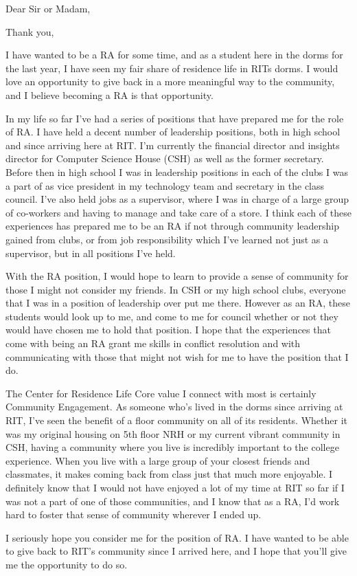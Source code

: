 \documentclass[11pt,a4paper,sans]{moderncv}        %
\begin{document}
\date{\today}
\opening{Dear Sir or Madam,}
\closing{Thank you,}
\makelettertitle


	I have wanted to be a RA for some time, and as a student here in the dorms for the last year, I have seen my fair share of residence life in RITs dorms. I would love an opportunity to give back in a more meaningful way to the community, and I believe becoming a RA is that opportunity.


	In my life so far I've had a series of positions that have prepared me for the role of RA. I have held a decent number of leadership positions, both in high school and since arriving here at RIT. I'm currently the financial director and insights director for Computer Science House (CSH) as well as the former secretary. Before then in high school I was in leadership positions in each of the clubs I was a part of as vice president in my technology team and secretary in the class council. I've also held jobs as a supervisor, where I was in charge of a large group of co-workers and having to manage and take care of a store. I think each of these experiences has prepared me to be an RA if not through community leadership gained from clubs, or from job responsibility which I've learned not just as a supervisor, but in all positions I've held.


	With the RA position, I would hope to learn to provide a sense of community for those I might not consider my friends. In CSH or my high school clubs, everyone that I was in a position of leadership over put me there. However as an RA, these students would look up to me, and come to me for council whether or not they would have chosen me to hold that position. I hope that the experiences that come with being an RA grant me skills in conflict resolution and with communicating with those that might not wish for me to have the position that I do.

The Center for Residence Life Core value I connect with most is certainly Community Engagement. As someone who’s lived in the dorms since arriving at RIT, I’ve seen the benefit of a floor community on all of its residents. Whether it was my original housing on 5th floor NRH or my current vibrant community in CSH, having a community where you live is incredibly important to the college experience. When you live with a large group of your closest friends and classmates, it makes coming back from class just that much more enjoyable. I definitely know that I would not have enjoyed a lot of my time at RIT so far if I was not a part of one of those communities, and I know that as a RA, I’d work hard to foster that sense of community wherever I ended up.


	I seriously hope you consider me for the position of RA. I have wanted to be able to give back to RIT’s community since I arrived here, and I hope that you’ll give me the opportunity to do so.

\makeletterclosing
\end{document}
